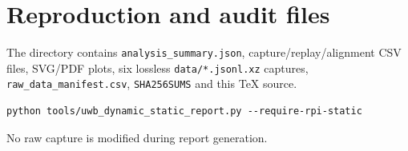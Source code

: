 \documentclass[10pt,a4paper]{article}
\begin{document}
\section{Reproduction and audit files}
The directory contains \texttt{analysis\_summary.json}, capture/replay/alignment
CSV files, SVG/PDF plots, six lossless \texttt{data/*.jsonl.xz} captures,
\texttt{raw\_data\_manifest.csv}, \texttt{SHA256SUMS} and this TeX source.

\begin{verbatim}
python tools/uwb_dynamic_static_report.py --require-rpi-static
\end{verbatim}

No raw capture is modified during report generation.
\end{document}
